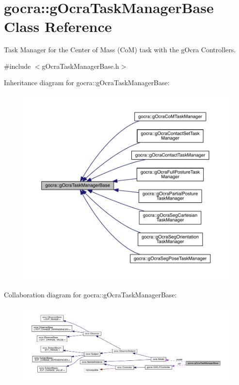 \hypertarget{classgocra_1_1gOcraTaskManagerBase}{}\section{gocra\+:\+:g\+Ocra\+Task\+Manager\+Base Class Reference}
\label{classgocra_1_1gOcraTaskManagerBase}


Task Manager for the Center of Mass (CoM) task with the g\+Ocra Controllers.  




{\ttfamily \#include $<$g\+Ocra\+Task\+Manager\+Base.\+h$>$}



Inheritance diagram for gocra\+:\+:g\+Ocra\+Task\+Manager\+Base\+:\nopagebreak
\begin{figure}[H]
\begin{center}
\leavevmode
\includegraphics[width=350pt]{da/dd1/classgocra_1_1gOcraTaskManagerBase__inherit__graph}
\end{center}
\end{figure}


Collaboration diagram for gocra\+:\+:g\+Ocra\+Task\+Manager\+Base\+:
\nopagebreak
\begin{figure}[H]
\begin{center}
\leavevmode
\includegraphics[width=350pt]{da/d7b/classgocra_1_1gOcraTaskManagerBase__coll__graph}
\end{center}
\end{figure}
